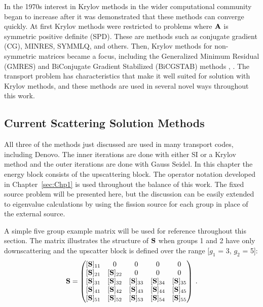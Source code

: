 In the 1970s interest in Krylov methods in the wider computational community began to increase after it was demonstrated that these methods can converge quickly. At first Krylov methods were restricted to problems where $\mathbf{A}$ is symmetric positive definite (SPD). These are methods such as conjugate gradient (CG), MINRES, SYMMLQ, and others. Then, Krylov methods for non-symmetric matrices became a focus, including the Generalized Minimum Residual (GMRES) and BiConjugate Gradient Stabilized (BiCGSTAB) methods \cite{Barrett1994}, \cite{Benzi2002}. The transport problem has characteristics that make it well suited for solution with Krylov methods, and these methods are used in several novel ways throughout this work.

\subsection{Current Scattering Solution Methods}
All three of the methods just discussed are used in many transport codes, including Denovo. The inner iterations are done with either SI or a Krylov method and the outer iterations are done with Gauss Seidel. In this chapter the energy block consists of the upscattering block. The operator notation developed in Chapter~\ref{sec:Chp1} is used throughout the balance of this work. The fixed source problem will be presented here, but the discussion can be easily extended to eigenvalue calculations by using the fission source for each group in place of the external source. 

A simple five group example matrix will be used for reference throughout this section. The matrix illustrates the structure of $\mathbf{S}$  when groups 1 and 2 have only downscattering and the upscatter block is defined over the range [$g_{1}$ = 3, $g_{2}$ = 5]:
%
\begin{equation}
  \mathbf{S}  =     \begin{pmatrix}
      [\ve{S}]_{11} &0 & 0 & 0 & 0 \\
      [\ve{S}]_{21} & [\ve{S}]_{22} & 0 & 0 & 0 \\
      [\ve{S}]_{31} & [\ve{S}]_{32} & [\ve{S}]_{33} & [\ve{S}]_{34} & [\ve{S}]_{35} \\
      [\ve{S}]_{41} & [\ve{S}]_{42} & [\ve{S}]_{43} & [\ve{S}]_{44} & [\ve{S}]_{45} \\
      [\ve{S}]_{51} & [\ve{S}]_{52} & [\ve{S}]_{53} & [\ve{S}]_{54} & [\ve{S}]_{55}
    \end{pmatrix} \:.
    \label{eq:exmp-matrix}
\end{equation}

